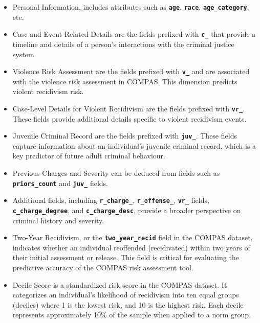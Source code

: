 \documentclass[conference]{IEEEtran}
\begin{document}
	\begin{itemize}
	
		\item Personal Information, includes attributes such as \textbf{\texttt{age}}, \textbf{\texttt{race}}, \textbf{\texttt{age\_category}}, etc.
		
		\item Case and Event-Related Details are the fields prefixed with \textbf{\texttt{c\_}} that provide a timeline and details of a person's interactions with the criminal justice system.
	
		\item Violence Risk Assessment are the fields prefixed with \textbf{\texttt{v\_}} and are associated with the violence risk assessment in COMPAS. This dimension predicts violent recidivism risk.
	
		\item Case-Level Details for Violent Recidivism are the fields prefixed with \textbf{\texttt{vr\_}}. These fields provide additional details specific to violent recidivism events.
	
		\item Juvenile Criminal Record are the fields prefixed with \textbf{\texttt{juv\_}}. These fields capture information about an individual's juvenile criminal record, which is a key predictor of future adult criminal behaviour.
	
		\item Previous Charges and Severity can be deduced from fields such as \textbf{\texttt{priors\_count}} and \textbf{\texttt{juv\_}} fields.
	
		\item Additional fields, including \textbf{\texttt{r\_charge\_}}, \textbf{\texttt{r\_offense\_}}, \textbf{\texttt{vr\_}} fields, \textbf{\texttt{c\_charge\_degree}}, and \textbf{\texttt{c\_charge\_desc}}, provide a broader perspective on criminal history and severity.
	
	
		\item Two-Year Recidivism, or the \textbf{\texttt{two\_year\_recid}} field in the COMPAS dataset, indicates whether an individual reoffended (recidivated) within two years of their initial assessment or release. This field is critical for evaluating the predictive accuracy of the COMPAS risk assessment tool.
	
		\item Decile Score is a standardized risk score in the COMPAS dataset. It categorizes an individual's likelihood of recidivism into ten equal groups (deciles) where 1 is the lowest risk, and 10 is the highest risk. Each decile represents approximately 10\% of the sample when applied to a norm group.

	\end{itemize}
\end{document}
